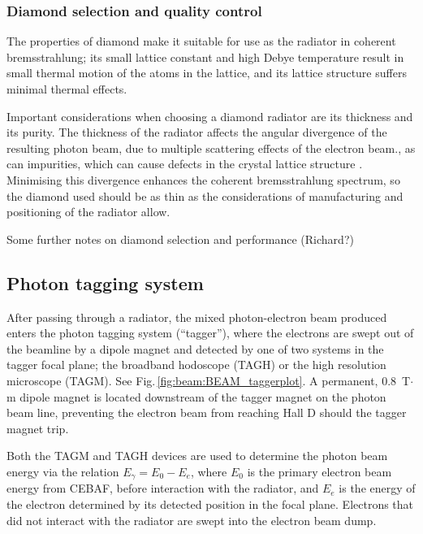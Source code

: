 \subsubsection{Diamond selection and quality control \label{sec:diamonds}}
The properties of diamond make it suitable for use as the radiator in coherent bremsstrahlung; its small lattice constant and high Debye temperature result in small thermal motion of the atoms in the lattice, and its lattice structure suffers minimal thermal effects.

Important considerations when choosing a diamond radiator are its thickness and its purity. The thickness of the radiator affects the angular divergence of the resulting photon beam, due to multiple scattering effects of the electron beam., as can impurities, which can cause defects in the crystal lattice structure \cite{YANG2010719,YANG2012}.
Minimising this divergence enhances the coherent bremsstrahlung spectrum, so the diamond used should be as thin as the considerations of manufacturing and positioning of the radiator allow.

{\color{red}Some further notes on diamond selection and performance (Richard?)}



\subsection{Photon tagging system \label{sec:tag}}
After passing through a radiator, the mixed photon-electron beam produced enters the photon tagging system (``tagger''), where the electrons are swept out of the beamline by a dipole magnet and detected by one of two systems in the tagger focal plane; the broadband hodoscope (TAGH) or the high resolution microscope (TAGM).
See Fig.\,\ref{fig:beam:BEAM_taggerplot}.
A permanent, 0.8~T$\cdot$m dipole magnet is located
downstream of the tagger magnet on the photon beam line, preventing
the electron beam from reaching Hall D should the tagger magnet trip.

Both the TAGM and TAGH devices are used to determine the photon beam energy via the relation $E_{\gamma} = E_{0} - E_{e}$, where $E_{0}$ is the primary electron beam energy from CEBAF, before interaction with the radiator, and $E_{e}$ is the energy of the electron determined by its detected position in the focal plane.
Electrons that did not interact with the radiator are swept into the electron beam dump.


